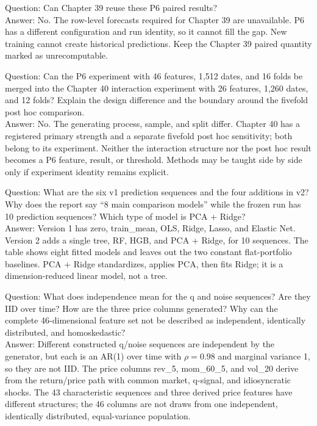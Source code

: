 \clearpage
{}
Question: Can Chapter 39 reuse these P6 paired results?\\
Answer: No. The row-level forecasts required for Chapter 39 are unavailable. P6 has a different configuration and run identity, so it cannot fill the gap. New training cannot create historical predictions. Keep the Chapter 39 paired quantity marked as unrecomputable.

\clearpage
{}
Question: Can the P6 experiment with 46 features, 1,512 dates, and 16 folds be merged into the Chapter 40 interaction experiment with 26 features, 1,260 dates, and 12 folds? Explain the design difference and the boundary around the fivefold post hoc comparison.\\
Answer: No. The generating process, sample, and split differ. Chapter 40 has a registered primary strength and a separate fivefold post hoc sensitivity; both belong to its experiment. Neither the interaction structure nor the post hoc result becomes a P6 feature, result, or threshold. Methods may be taught side by side only if experiment identity remains explicit.

\clearpage
{}
Question: What are the six v1 prediction sequences and the four additions in v2? Why does the report say “8 main comparison models” while the frozen run has 10 prediction sequences? Which type of model is PCA + Ridge?\\
Answer: Version 1 has zero, train\_mean, OLS, Ridge, Lasso, and Elastic Net. Version 2 adds a single tree, RF, HGB, and PCA + Ridge, for 10 sequences. The table shows eight fitted models and leaves out the two constant flat-portfolio baselines. PCA + Ridge standardizes, applies PCA, then fits Ridge; it is a dimension-reduced linear model, not a tree.

\clearpage
{}
Question: What does independence mean for the q and noise sequences? Are they IID over time? How are the three price columns generated? Why can the complete 46-dimensional feature set not be described as independent, identically distributed, and homoskedastic?\\
Answer: Different constructed q/noise sequences are independent by the generator, but each is an AR(1) over time with \(\rho=0.98\) and marginal variance 1, so they are not IID. The price columns rev\_5, mom\_60\_5, and vol\_20 derive from the return/price path with common market, q-signal, and idiosyncratic shocks. The 43 characteristic sequences and three derived price features have different structures; the 46 columns are not draws from one independent, identically distributed, equal-variance population.

